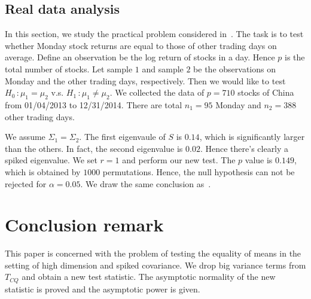 \documentclass[review]{elsarticle}
\theoremstyle{plain}
\theoremstyle{definition}
\theoremstyle{remark}
\begin{document}

\subsection{Real data analysis}
In this section, we study the practical problem considered in~\cite{Ma2015A}.
The task is to test whether Monday stock returns are equal to those of other trading days on average.
Define an observation be the log return of stocks in a day.
Hence $p$ is the total number of stocks.
Let sample $1$ and sample $2$ be the observations on Monday and the other trading days, respectively.
Then we would like to test $H_0\, :\mu_1=\mu_2$ v.s. $H_1\,:\mu_1\neq \mu_2$.
We collected the data of $p=710$
 stocks of China
from 01/04/2013 to 12/31/2014. There are total $n_1=95$ Monday and $n_2=388$ other trading days. 

We assume $\Sigma_1=\Sigma_2$.
The first eigenvaule of $S$ is $0.14$, which is significantly larger than the others.
In fact, the second eigenvalue is $0.02$.
Hence there's clearly a spiked eigenvalue.
We set $r=1$ and perform our new test.
The $p$ value is $0.149$, which is obtained by $1000$ permutations.
Hence, the null hypothesis can not be rejected for $\alpha=0.05$.
We draw the same conclusion as~\cite{Ma2015A}.

\section{Conclusion remark}

This paper is concerned with the problem of testing the equality of means in the setting of high dimension and spiked covariance. We drop big variance terms from $T_{CQ}$ and obtain a new test statistic. The asymptotic normality of the new statistic is proved and the asymptotic power is given. %
\end{document}
